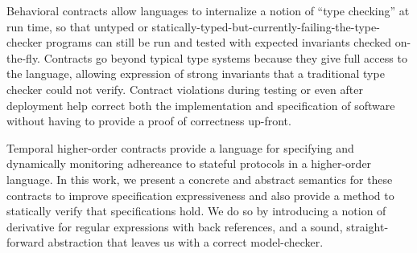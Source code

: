 Behavioral contracts allow languages to internalize a notion of ``type checking'' at run time, so that untyped or statically-typed-but-currently-failing-the-type-checker programs can still be run and tested with expected invariants checked on-the-fly.
%
Contracts go beyond typical type systems because they give full access to the language, allowing expression of strong invariants that a traditional type checker could not verify.
%
Contract violations during testing or even after deployment help correct both the implementation and specification of software without having to provide a proof of correctness up-front.

Temporal higher-order contracts provide a language for specifying and dynamically monitoring adhereance to stateful protocols in a higher-order language.
%
In this work, we present a concrete and abstract semantics for these contracts to improve specification expressiveness and also provide a method to statically verify that specifications hold.
%
We do so by introducing a notion of derivative for regular expressions with back references, and a sound, straight-forward abstraction that leaves us with a correct model-checker.